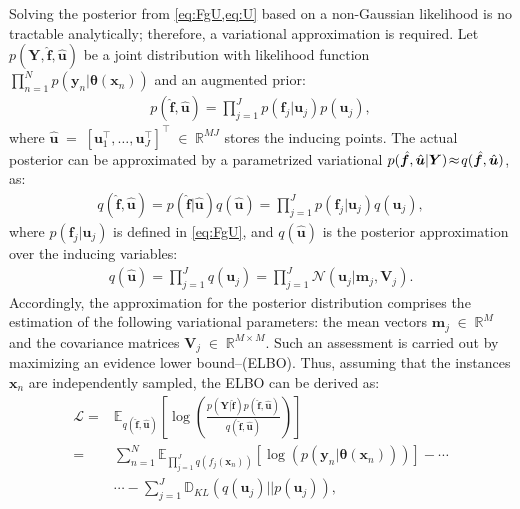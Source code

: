 \documentclass[journal]{IEEEtran}
\providecommand{\ve}[1]{{\bm{#1}}}%
\providecommand{\mat}[1]{{\bm{#1}}} %
\newcommand{\Real}{\mathbb{R}}
\DeclareMathOperator{\en}{\!\,\in\!\,}
\DeclareMathOperator{\igual}{\!\,=\!\,}
\providecommand{\s}[1]{\negthinspace#1\negthinspace}%
\providecommand{\ve}[1]{{\mathbf{#1}}}
\providecommand{\mat}[1]{{\mathbf{#1}}}
\newcommand{\gauss}{\mathcal{N}} %
\begin{document}
Solving the posterior from \cref{eq:FgU,eq:U} based on a non-Gaussian likelihood is no tractable analytically; therefore, a variational approximation is required. Let $p(\mat{Y},\hat{\ve{f}},\hat{\ve{u}})$ be a joint distribution with likelihood function $\prod_{n=1}^{N}p(\ve{y}_n|\bm{\theta}(\ve{x}_n))$ and an augmented prior:
\begin{align}
\label{eq:CGPpri}
p(\hat{\ve{f}}, \hat{\ve{u}}) = \prod_{j=1}^{J}p(\ve{f}_j|\ve{u}_j)p(\ve{u}_j),
\end{align}
where $\hat{\ve{u}}\igual \left[\ve{u}_1^{\top},\dots, \ve{u}_J^{\top}\right]^{\top}\en \Real^{MJ}$ stores the inducing points. The actual posterior can be approximated by a parametrized variational $p(\hat{\ve{f}},\hat{\ve{u}}|\mat{Y})\s{\approx} q(\hat{\ve{f}},\hat{\ve{u}})$, as:
\begin{align}
q(\hat{\ve{f}},\hat{\ve{u}}) = p(\hat{\ve{f}}|\hat{\ve{u}})q(\hat{\ve{u}})= \prod_{j=1}^{J}p(\ve{f}_j|\ve{u}_j)q(\ve{u}_j),
\end{align}
where $p(\ve{f}_j|\ve{u}_j)$ is defined in \cref{eq:FgU}, and $q(\hat{\ve{u}})$ is the posterior approximation over the inducing variables:
\begin{align}
\label{eq:QU}
q(\hat{\ve{u}}) = \prod_{j=1}^{J}q(\ve{u}_j)=\prod_{j=1}^{J}\gauss\left(\ve{u}_j|\ve{m}_j,\mat{V}_j\right).
\end{align}
Accordingly, the approximation for the posterior distribution comprises the estimation of the following variational parameters: the mean vectors $\ve{m}_j\en \Real^{M}$ and the covariance matrices $\mat{V}_j\en \Real^{M\times M}$. Such an assessment is carried out by maximizing an evidence lower bound--(ELBO). Thus, assuming that the instances $\ve{x}_n$ are independently sampled, the ELBO can be derived as:
\begin{align}
\label{eq:LowBound}
\mathcal{L}=&\mathbb{E}_{q(\hat{\ve{f}},\hat{\ve{u}})}\left[\log\left( \frac{p(\mat{Y}|\hat{\ve{f}})p(\hat{\ve{f}},\hat{\ve{u}})}{q(\hat{\ve{f}},\hat{\ve{u}})}\right)\right]\\
=&\sum_{n=1}^{N}\mathbb{E}_{\prod\limits^J_{j=1}q(f_j(\ve{x}_n))}\left[\log\left( p\left(\ve{y}_n|\bm{\theta}(\ve{x}_n)\right)\right)\right]-\cdots\nonumber\\
&\cdots-\sum_{j=1}^{J} \mathbb{D}_{KL}(q(\ve{u}_j)||p(\ve{u}_j))\label{eq:LowBound21},
\end{align}
\end{document}
